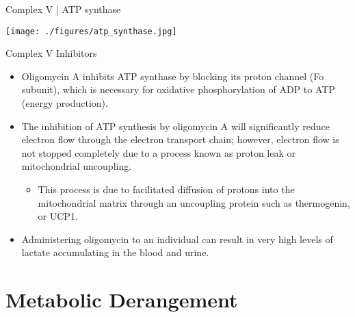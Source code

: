 \documentclass[presentation, smaller]{beamer}
\begin{document}
\begin{frame}[label={sec:org881e9ad}]{Complex V | ATP synthase}
\begin{center}
\texttt{[image: ./figures/atp\_synthase.jpg]}
\label{org2d7e0f3}
\end{center}


\centering
{}
\end{frame}


\begin{frame}[label={sec:orgc1df86a}]{Complex V Inhibitors}
\begin{itemize}
\item Oligomycin A inhibits ATP synthase by blocking its proton channel
(Fo subunit), which is necessary for oxidative phosphorylation of
ADP to ATP (energy production).
\item The inhibition of ATP synthesis by oligomycin A will significantly
reduce electron flow through the electron transport chain; however,
electron flow is not stopped completely due to a process known as
proton leak or mitochondrial uncoupling.
\begin{itemize}
\item This process is due to facilitated diffusion of protons into the
mitochondrial matrix through an uncoupling protein such as
thermogenin, or UCP1.
\end{itemize}

\item Administering oligomycin to an individual can result in very high
levels of lactate accumulating in the blood and urine.
\end{itemize}
\end{frame}


\section{Metabolic Derangement}
\label{sec:org98f87b7}
\end{document}
